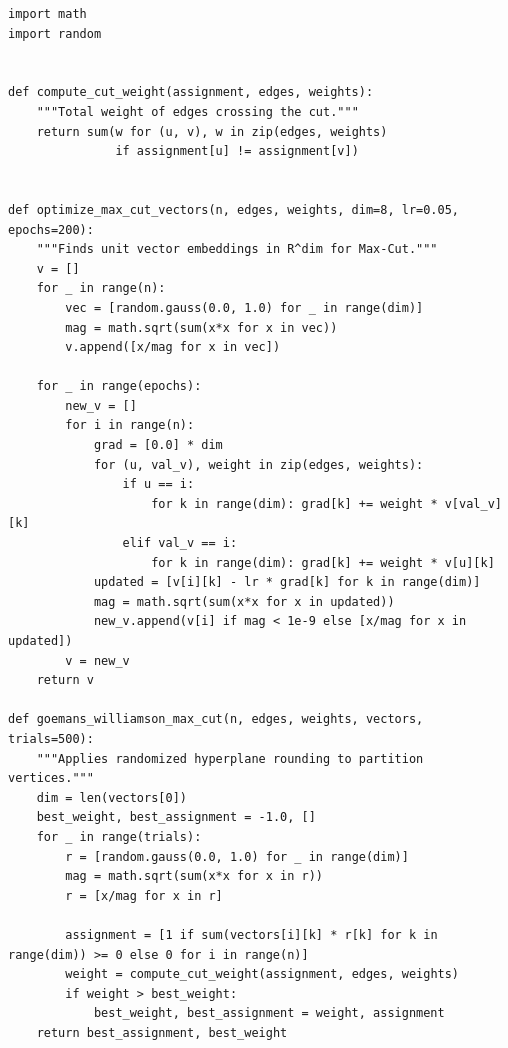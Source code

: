 \begin{lstlisting}[style=python, caption=Goemans-Williamson Max-Cut Algorithm]
import math
import random


def compute_cut_weight(assignment, edges, weights):
    """Total weight of edges crossing the cut."""
    return sum(w for (u, v), w in zip(edges, weights)
               if assignment[u] != assignment[v])


def optimize_max_cut_vectors(n, edges, weights, dim=8, lr=0.05, epochs=200):
    """Finds unit vector embeddings in R^dim for Max-Cut."""
    v = []
    for _ in range(n):
        vec = [random.gauss(0.0, 1.0) for _ in range(dim)]
        mag = math.sqrt(sum(x*x for x in vec))
        v.append([x/mag for x in vec])
        
    for _ in range(epochs):
        new_v = []
        for i in range(n):
            grad = [0.0] * dim
            for (u, val_v), weight in zip(edges, weights):
                if u == i:
                    for k in range(dim): grad[k] += weight * v[val_v][k]
                elif val_v == i:
                    for k in range(dim): grad[k] += weight * v[u][k]
            updated = [v[i][k] - lr * grad[k] for k in range(dim)]
            mag = math.sqrt(sum(x*x for x in updated))
            new_v.append(v[i] if mag < 1e-9 else [x/mag for x in updated])
        v = new_v
    return v

def goemans_williamson_max_cut(n, edges, weights, vectors, trials=500):
    """Applies randomized hyperplane rounding to partition vertices."""
    dim = len(vectors[0])
    best_weight, best_assignment = -1.0, []
    for _ in range(trials):
        r = [random.gauss(0.0, 1.0) for _ in range(dim)]
        mag = math.sqrt(sum(x*x for x in r))
        r = [x/mag for x in r]
        
        assignment = [1 if sum(vectors[i][k] * r[k] for k in range(dim)) >= 0 else 0 for i in range(n)]
        weight = compute_cut_weight(assignment, edges, weights)
        if weight > best_weight:
            best_weight, best_assignment = weight, assignment
    return best_assignment, best_weight
\end{lstlisting}

